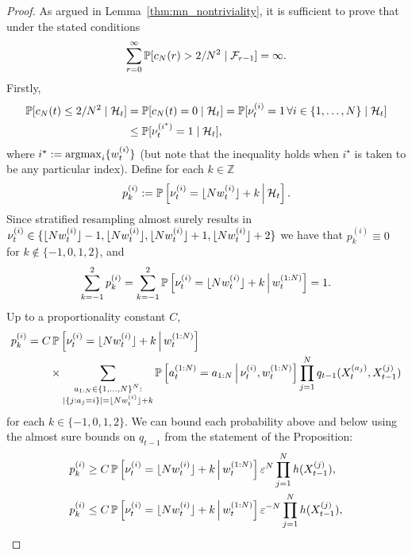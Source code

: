 \begin{proof}
As argued in Lemma~\ref{thm:mn_nontriviality}, it is sufficient to prove that under the stated conditions
\begin{equation*}
\sum_{r=0}^\infty \mathbb{P}[ c_N(r) > 2/N^2  \mid \mathcal{F}_{r-1} ] = \infty .
\end{equation*}
Firstly,
\begin{align}
\mathbb{P}[ c_N(t) \leq 2/N^2 \mid \mathcal{H}_t ]
&= \mathbb{P}[ c_N(t) =0 \mid \mathcal{H}_t ]
= \mathbb{P}[ \nu_t^{(i)} =1 \,\forall i\in\{1,\dots,N\} \mid \mathcal{H}_t ] \notag\\
&\leq \mathbb{P}[ \nu_t^{(i^\star)} =1 \mid \mathcal{H}_t ] , \label{eq:cNnonzero}
\end{align}
where $i^\star := \operatorname*{argmax}_i \{ w_t^{(i)} \}$ (but note that the inequality holds when $i^\star$ is taken to be any particular index).
Define for each $k\in\mathbb{Z}$
\begin{equation}\label{eq:pk_defn}
p_k^{(i)} := \mathbb{P} \left[ \nu_t^{(i)} = \lfloor N w_t^{(i)} \rfloor + k \,\middle|\, \mathcal{H}_t \right] .
\end{equation}
Since stratified resampling almost surely results in $\nu_t^{(i)} \in \{ \lfloor N w_t^{(i)} \rfloor-1, \lfloor N w_t^{(i)} \rfloor, \lfloor N w_t^{(i)} \rfloor+1, \lfloor N w_t^{(i)} \rfloor+2 \}$ we have that $p_k^{(i)} \equiv 0$ for $k\notin \{-1,0,1,2\}$, and
\begin{equation*}
\sum_{k=-1}^2 p_k^{(i)} 
= \sum_{k=-1}^2 \mathbb{P} \left[ \nu_t^{(i)} = \lfloor N w_t^{(i)} \rfloor + k \,\middle|\, w_t^{(1:N)} \right]
= 1 .
\end{equation*}
Up to a proportionality constant $C$,
\begin{align*}
p_k^{(i)} 
&= C \, \mathbb{P} \left[ \nu_t^{(i)} = \lfloor N w_t^{(i)} \rfloor + k \,\middle|\, w_t^{(1:N)} \right] \\
    &\qquad \times \sum_{\substack{a_{1:N} \in \{1,\dots,N\}^N : 
        \\ |\{j: a_j=i\}|=\lfloor N w_t^{(i)} \rfloor +k }}
        \mathbb{P}\left[ a_t^{(1:N)} = a_{1:N} \,\middle|\, \nu_t^{(i)}, w_t^{(1:N)} \right]
        \prod_{j=1}^N q_{t-1}( X_t^{(a_j)}, X_{t-1}^{(j)} ) 
\end{align*}
for each $k\in\{-1,0,1,2\}$.
We can bound each probability above and below using the almost sure bounds on $q_{t-1}$ from the statement of the Proposition:
\begin{align*}
p_k^{(i)}
&\geq C \, \Prob \left[ \nu_t^{(i)} = \flnw + k \midd w_t^{(1:N)} \right] \varepsilon^N
        \prod_{j=1}^N h(X_{t-1}^{(j)}) , \\
p_k^{(i)}
&\leq C \, \Prob \left[ \nu_t^{(i)} = \flnw + k \midd w_t^{(1:N)} \right] 
        \varepsilon^{-N} \prod_{j=1}^N h(X_{t-1}^{(j)}) ,

\end{align*}
\end{proof}
